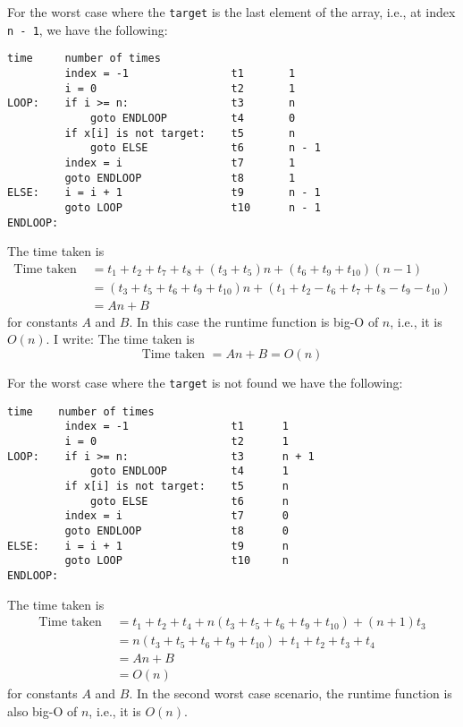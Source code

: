 For the worst case where the \verb!target! is the last element of the array,
i.e., at index \verb!n - 1!,
we have the following:
\begin{Verbatim}[frame=single, fontsize=\footnotesize]
                                   time     number of times   
         index = -1                t1       1
         i = 0                     t2       1
LOOP:    if i >= n:                t3       n
             goto ENDLOOP          t4       0
         if x[i] is not target:    t5       n 
             goto ELSE             t6       n - 1
         index = i                 t7       1
         goto ENDLOOP              t8       1
ELSE:    i = i + 1                 t9       n - 1
         goto LOOP                 t10      n - 1
ENDLOOP:
\end{Verbatim}
The time taken is
\begin{align*}
\text{Time taken } 
&= t_1 + t_2 + t_7 + t_8 + 
   (t_3 + t_5)n + 
   (t_6 + t_9 + t_{10})(n - 1) \\
&= (t_3 + t_5 + t_6 + t_9 + t_{10})n +
   (t_1 + t_2 - t_6 + t_7 
    + t_8 - t_9 - t_{10}) \\ 
&= An + B
\end{align*}
for constants $A$ and $B$.
In this case the runtime function is big-O of $n$, i.e., it is 
$O(n)$.
I write:
The time taken is
\[
\text{Time taken } 
= An + B = O(n)
\]

For the worst case where the \verb!target! is not found
we have the following:
\begin{Verbatim}[frame=single, fontsize=\footnotesize]
                                   time    number of times   
         index = -1                t1      1
         i = 0                     t2      1
LOOP:    if i >= n:                t3      n + 1
             goto ENDLOOP          t4      1
         if x[i] is not target:    t5      n 
             goto ELSE             t6      n
         index = i                 t7      0
         goto ENDLOOP              t8      0
ELSE:    i = i + 1                 t9      n
         goto LOOP                 t10     n
ENDLOOP:
\end{Verbatim}
The time taken is
\begin{align*}
\text{Time taken } 
  &= t_1 + t_2 + 
    t_4 + 
    n(t_3 + t_5 + t_6 + t_9 + t_{10}) +
    (n + 1) t_3 \\
  &= n(t_3 + t_5 + 
    t_6  + 
    t_9 +
    t_{10}
    )
    +
    t_1 + 
    t_2 + 
    t_3 + 
    t_4 \\
&= An + B \\
&= O(n)
\end{align*}
for constants $A$ and $B$.
In the second worst case scenario,
the runtime function is also big-O of $n$, 
i.e., it is $O(n)$.

